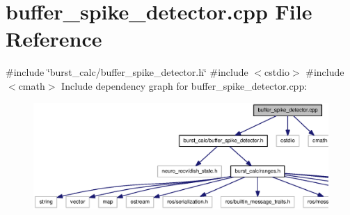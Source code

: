 \section{buffer\-\_\-spike\-\_\-detector.\-cpp \-File \-Reference}
\label{buffer__spike__detector_8cpp}
{\ttfamily \#include \char`\"{}burst\-\_\-calc/buffer\-\_\-spike\-\_\-detector.\-h\char`\"{}}\*
{\ttfamily \#include $<$cstdio$>$}\*
{\ttfamily \#include $<$cmath$>$}\*
\-Include dependency graph for buffer\-\_\-spike\-\_\-detector.\-cpp\-:\nopagebreak
\begin{figure}[H]
\begin{center}
\leavevmode
\includegraphics[width=350pt]{buffer__spike__detector_8cpp__incl}
\end{center}
\end{figure}
